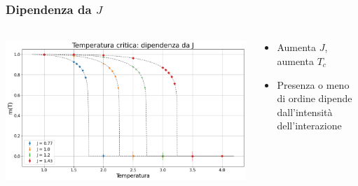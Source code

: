 \begin{frame}
    \frametitle{Dipendenza da $J$}
    \framesubtitle{}

    \begin{columns}
        \begin{column}{0.6\textwidth}

            \centering
            \includegraphics[width=\textwidth]{Immagini/simIsing2D/dipJ_Tc.png}

        \end{column}
    
        \begin{column}{0.4\textwidth}

                \begin{itemize}[itemsep=0.5em, label=$\diamond$]
                    \item Aumenta $J$, aumenta $T_c$
                    \item Presenza o meno di ordine dipende dall'intensità dell'interazione
                \end{itemize}
            
        \end{column}
    \end{columns}

\end{frame}



